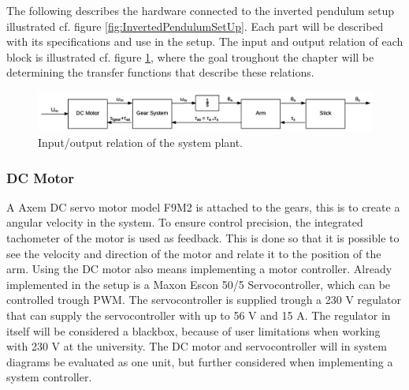 The following describes the hardware connected to the inverted pendulum setup illustrated cf. figure \ref{fig:InvertedPendulumSetUp}.
Each part will be described with its specifications and use in the setup. The input and output relation of each block is illustrated cf. figure \ref{fig:DCMotorRelation}, where the goal troughout the chapter will be determining the transfer functions that describe these relations.

\begin{figure} [htbp]
\hspace*{-3.5cm}  
	\centering
	\includegraphics[width=0.95\paperwidth]{figures/modeling/InputOutputSystem.png}
	\caption{Input/output relation of the system plant.} \label{fig:DCMotorRelation}
\end{figure}

\startexplain
\stopexplain

\subsubsection{DC Motor}
A Axem DC servo motor model F9M2 is attached to the gears, this is to create a angular velocity in the system. To ensure control precision, the integrated tachometer of the motor is used as feedback. This is done so that it is possible to see the velocity and direction of the motor and relate it to the position of the arm. Using the DC motor also means implementing a motor controller. Already implemented in the setup is a Maxon Escon 50/5 Servocontroller, which can be controlled trough PWM. The servocontroller is supplied trough a 230 V regulator that can supply the servocontroller with up to 56 V and 15 A. The regulator in itself will be considered a blackbox, because of user limitations when working with 230 V at the university. The DC motor and servocontroller will in system diagrams be evaluated as one unit, but further considered when implementing a system controller.        

